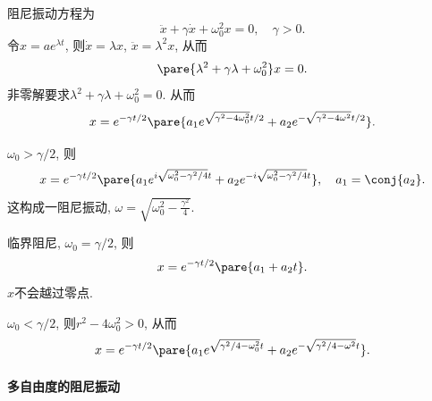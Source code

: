 \documentclass[../LectureNotes.tex]{subfiles}
\begin{document}
阻尼振动方程为
\[ \ddot{x} + \gamma\dot{x} + \omega_0^2 x = 0,\quad \gamma>0. \]
令$x = ae^{\lambda t}$, 则$\dot{x} = \lambda x$, $\ddot{x} = \lambda^2 x$, 从而
\[ \pare{\lambda^2 + \gamma\lambda + \omega_0^2} x = 0. \]
非零解要求$\lambda^2 + \gamma\lambda + \omega_0^2 = 0$. 从而
\[ x = e^{-\gamma t/2} \pare{a_1 e^{\sqrt{\gamma^2 - 4\omega_0^2}t/2} + a_2 e^{-\sqrt{\gamma^2 - 4\omega^2}t/2}}. \]
\begin{cenum}
    \item $\omega_0 > \gamma/2$, 则
    \[ x = e^{-\gamma t/2} \pare{a_1 e^{i\sqrt{\omega_0^2 - \gamma^2/4}t} + a_2 e^{-i\sqrt{\omega_0^2 - \gamma^2/4}t}},\quad a_1 = \conj{a_2}. \]
    这构成一阻尼振动, $\displaystyle \omega = \sqrt{\omega_0^2 - \frac{\gamma^2}{4}}$.
    \item 临界阻尼, $\omega_0 = \gamma/2$, 则
    \[ x = e^{-\gamma t/2} \pare{a_1 + a_2 t}. \]
    $x$不会越过零点.
    \item $\omega_0 < \gamma/2$, 则$r^2 - 4\omega_0^2 > 0$, 从而
    \[ x = e^{-\gamma t/2}\pare{a_1 e^{\sqrt{\gamma^2/4 - \omega_0^2}t} + a_2 e^{-\sqrt{\gamma^2/4 - \omega^2}t}}. \]
\end{cenum}

\paragraph{多自由度的阻尼振动} %
\label{par:多自由度的阻尼振动}
\end{document}
